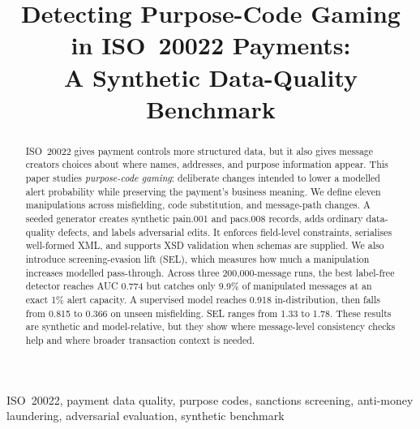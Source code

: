 \documentclass[conference]{IEEEtran}
\newif\ifanonymous
\begin{document}
\title{Detecting Purpose-Code Gaming in ISO~20022 Payments:\\
A Synthetic Data-Quality Benchmark}

\ifanonymous
\author{\IEEEauthorblockN{Anonymous Author(s)}
\IEEEauthorblockA{\textit{Affiliation withheld for review}\\
Location withheld\\
Contact details withheld}}
\else
\author{
}
\fi

\maketitle

\begin{abstract}
ISO~20022 gives payment controls more structured data, but it also gives
message creators choices about where names, addresses, and purpose information
appear. This paper studies \emph{purpose-code gaming}: deliberate changes
intended to lower a modelled alert probability while preserving the payment's
business meaning. We define eleven manipulations across misfielding, code
substitution, and message-path changes. A seeded generator creates synthetic
pain.001 and pacs.008 records, adds ordinary data-quality defects, and labels
adversarial edits. It enforces field-level constraints, serialises well-formed
XML, and supports XSD validation when schemas are supplied. We also introduce
screening-evasion lift (SEL), which measures how much a manipulation increases
modelled pass-through. Across three 200,000-message runs, the best label-free
detector reaches AUC 0.774 but catches only 9.9\% of manipulated messages at an
exact 1\% alert capacity. A supervised model reaches 0.918 in-distribution,
then falls from 0.815 to 0.366 on unseen misfielding. SEL ranges from 1.33 to
1.78. These results are synthetic and model-relative, but they show where
message-level consistency checks help and where broader transaction context is
needed.
\end{abstract}

\begin{IEEEkeywords}
ISO~20022, payment data quality, purpose codes, sanctions screening,
anti-money laundering, adversarial evaluation, synthetic benchmark
\end{IEEEkeywords}
\end{document}
